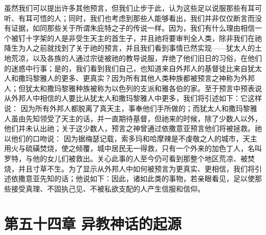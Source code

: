 虽然我们可以提出许多其他预言，但我们止步于此，认为这些足以说服那些有耳可听、有耳可悟的人；同时，我们也考虑到那些人能够看出，我们并非仅仅断言而没有证据，如同那些关于所谓朱庇特之子的传说一样。因为，我们有什么理由相信一个被钉十字架的人是非受生天主的首生子，并且祂将要审判全人类，除非我们在祂降生为人之前就找到了关于祂的预言，并且我们看到事情已然实现——犹太人的土地荒凉，以及各族的人通过宗徒被祂的教导说服，弃绝了他们旧日的习俗，在他们的迷惑中行事；是的，我们看到我们自己，也知道来自外邦人的基督徒比来自犹太人和撒玛黎雅人的更多、更真实？因为所有其他人类种族都被预言之神称为外邦人；但犹太和撒玛黎雅种族被称为以色列的支派和雅各伯的家。至于预言中预表说从外邦人中相信的人要比从犹太人和撒玛黎雅人中更多，我们将引述如下：它这样说： 因为所有外邦人都脱离了真天主，事奉他们手所做的；而犹太人和撒玛黎雅人虽由先知领受了天主的话，并一直期待基督，但祂来的时候，除了少数人以外，他们并未认出祂；关于这少数人，预言之神曾通过依撒意亚预言他们将被拯救。祂以他们的口吻说： 因为据梅瑟记载，索多玛和哈摩辣是不虔敬之人的城市，天主用火与硫磺焚烧，使之倾覆，城中居民无一得救，只有一个外来的加色丁人，名叫罗特，与他的女儿们被救出。关心此事的人至今仍可看到那整个地区荒凉、被焚烧，并且寸草不生。为了显示从外邦人中如何被预言为更真实、更相信，我们将引述依撒意亚先知的话；他说如下：因此，诸如此类的事物，若亲眼看见，足以使那些接受真理、不固执己见、不被私欲支配的人产生信服和信仰。\par


\section{第五十四章 异教神话的起源}

